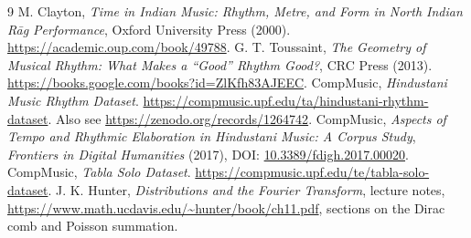\documentclass[11pt,letterpaper]{article}
\begin{document}
\begin{thebibliography}{9}
 M. Clayton, \emph{Time in Indian Music: Rhythm, Metre, and Form in North Indian R\=ag Performance}, Oxford University Press (2000). \url{https://academic.oup.com/book/49788}.
 G. T. Toussaint, \emph{The Geometry of Musical Rhythm: What Makes a ``Good'' Rhythm Good?}, CRC Press (2013). \url{https://books.google.com/books?id=ZlKfh83AJEEC}.
 CompMusic, \emph{Hindustani Music Rhythm Dataset}. \url{https://compmusic.upf.edu/ta/hindustani-rhythm-dataset}. Also see \url{https://zenodo.org/records/1264742}.
 CompMusic, \emph{Aspects of Tempo and Rhythmic Elaboration in Hindustani Music: A Corpus Study}, \emph{Frontiers in Digital Humanities} (2017), DOI: \href{https://doi.org/10.3389/fdigh.2017.00020}{10.3389/fdigh.2017.00020}.
 CompMusic, \emph{Tabla Solo Dataset}. \url{https://compmusic.upf.edu/te/tabla-solo-dataset}.
 J. K. Hunter, \emph{Distributions and the Fourier Transform}, lecture notes, \url{https://www.math.ucdavis.edu/~hunter/book/ch11.pdf}, sections on the Dirac comb and Poisson summation.
\end{thebibliography}
\end{document}
